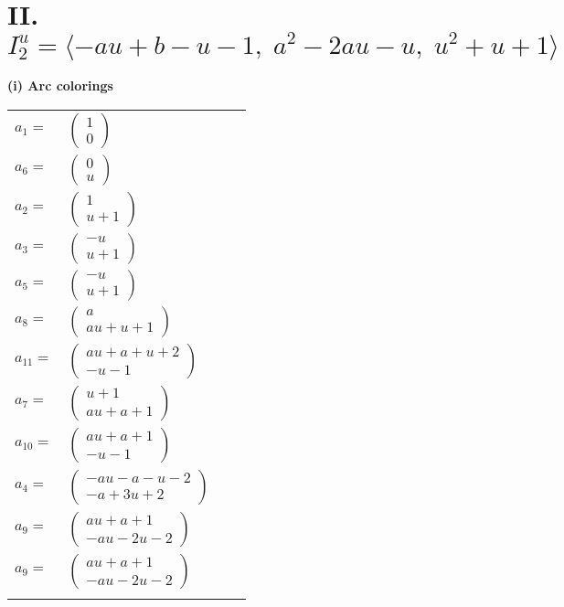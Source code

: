 \documentclass[1p]{elsarticle_modified}
\theoremstyle{definition}
\begin{document}
\centering \section*{II. $I^u_{2}= \langle - a u+b- u-1,\;a^2-2 a u- u,\;u^2+u+1 \rangle$}
\flushleft \textbf{(i) Arc colorings}\\
\begin{tabular}{m{7pt} m{180pt} m{7pt} m{180pt} }
\flushright $a_{1}=$&$\begin{pmatrix}1\\0\end{pmatrix}$ \\
\flushright $a_{6}=$&$\begin{pmatrix}0\\u\end{pmatrix}$ \\
\flushright $a_{2}=$&$\begin{pmatrix}1\\u+1\end{pmatrix}$ \\
\flushright $a_{3}=$&$\begin{pmatrix}- u\\u+1\end{pmatrix}$ \\
\flushright $a_{5}=$&$\begin{pmatrix}- u\\u+1\end{pmatrix}$ \\
\flushright $a_{8}=$&$\begin{pmatrix}a\\a u+u+1\end{pmatrix}$ \\
\flushright $a_{11}=$&$\begin{pmatrix}a u+a+u+2\\- u-1\end{pmatrix}$ \\
\flushright $a_{7}=$&$\begin{pmatrix}u+1\\a u+a+1\end{pmatrix}$ \\
\flushright $a_{10}=$&$\begin{pmatrix}a u+a+1\\- u-1\end{pmatrix}$ \\
\flushright $a_{4}=$&$\begin{pmatrix}- a u- a- u-2\\- a+3 u+2\end{pmatrix}$ \\
\flushright $a_{9}=$&$\begin{pmatrix}a u+a+1\\- a u-2 u-2\end{pmatrix}$\\ \flushright $a_{9}=$&$\begin{pmatrix}a u+a+1\\- a u-2 u-2\end{pmatrix}$\\&\end{tabular}
\end{document}

